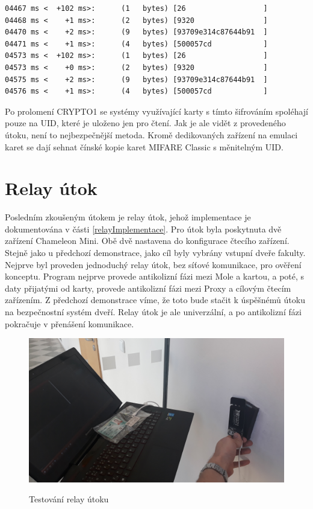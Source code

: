 \begin{lstlisting}[caption=Část komunikace čtecího zařízení, label={emulaceZaznam}]
04467 ms <  +102 ms>:      (1   bytes) [26                  ]
04468 ms <    +1 ms>:      (2   bytes) [9320                ]
04470 ms <    +2 ms>:      (9   bytes) [93709e314c87644b91  ]
04471 ms <    +1 ms>:      (4   bytes) [500057cd            ]
04573 ms <  +102 ms>:      (1   bytes) [26                  ]
04573 ms <    +0 ms>:      (2   bytes) [9320                ]
04575 ms <    +2 ms>:      (9   bytes) [93709e314c87644b91  ]
04576 ms <    +1 ms>:      (4   bytes) [500057cd            ]
\end{lstlisting}
Po prolomení CRYPTO1 se systémy využívající karty s tímto šifrováním spoléhají pouze na UID, které je uloženo jen pro čtení. Jak je ale vidět z provedeného útoku, není to nejbezpečnější metoda. Kromě dedikovaných zařízení na emulaci karet se dají sehnat čínské kopie karet MIFARE Classic s měnitelným UID. 

\section{Relay útok}
Posledním zkoušeným útokem je relay útok, jehož implementace je dokumentována v části \ref{relayImplementace}. Pro útok byla poskytnuta dvě zařízení Chameleon Mini. Obě dvě nastavena do konfigurace čtecího zařízení. Stejně jako u předchozí demonstrace, jako cíl byly vybrány vstupní dveře fakulty. Nejprve byl proveden jednoduchý relay útok, bez síťové komunikace, pro ověření konceptu. Program nejprve provede antikolizní fázi mezi Mole a kartou, a poté, s daty přijatými od karty, provede antikolizní fázi mezi Proxy a cílovým čtecím zařízením. Z předchozí demonstrace víme, že toto bude stačit k úspěšnémů útoku na bezpečnostní systém dveří. Relay útok je ale univerzální, a po antikolizní fázi pokračuje v přenášení komunikace. \par

\begin{figure}[ht]\centering
  \centering
  \includegraphics[width=\linewidth]{obrazky-figures/obrazekPokusRelay.jpg}\\[1pt]  
  \caption{Testování relay útoku}    
  \label{obrazekPokusRelay}
\end{figure}

